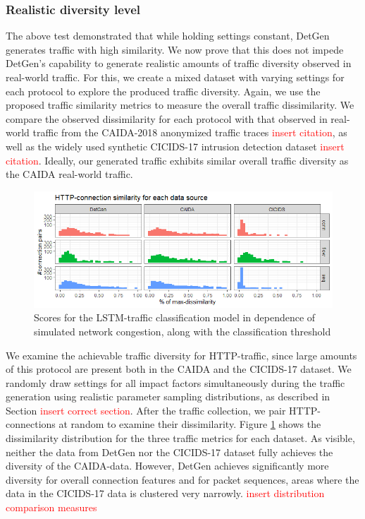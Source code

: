 \documentclass{article}
\begin{document}
\subsubsection{Realistic diversity level}

The above test demonstrated that while holding settings constant, DetGen generates traffic with high similarity. We now prove that this does not impede DetGen's capability to generate realistic amounts of traffic diversity observed in real-world traffic. For this, we create a mixed dataset with varying settings for each protocol to explore the produced traffic diversity. Again, we use the proposed traffic similarity metrics to measure the overall traffic dissimilarity. 
We compare the observed dissimilarity for each protocol with that observed in real-world traffic from the CAIDA-2018 anonymized traffic traces \textcolor{red}{insert citation}, as well as the widely used synthetic CICIDS-17 intrusion detection dataset \textcolor{red}{insert citation}. Ideally, our generated traffic exhibits similar overall traffic diversity as the CAIDA real-world traffic.



\begin{figure}
\centering
\includegraphics[width=1\textwidth]{images/HTTP_similarity.png}
\caption{Scores for the LSTM-traffic classification model in dependence of simulated network congestion, along with the classification threshold}\label{fig:diversity_exp}
\end{figure}

We examine the achievable traffic diversity for HTTP-traffic, since large amounts of this protocol are present both in the CAIDA and the CICIDS-17 dataset.
We randomly draw settings for all impact factors simultaneously during the traffic generation using realistic parameter sampling distributions, as described in Section \textcolor{red}{insert correct section}. After the traffic collection, we pair HTTP-connections at random to examine their dissimilarity. Figure \ref{fig:diversity_exp} shows the dissimilarity distribution for the three traffic metrics for each dataset. As visible, neither the data from DetGen nor the CICIDS-17 dataset fully achieves the diversity of the CAIDA-data. However, DetGen achieves significantly more diversity for overall connection features and for packet sequences, areas where the data in the CICIDS-17 data is clustered very narrowly. \textcolor{red}{insert distribution comparison measures}
\end{document}
